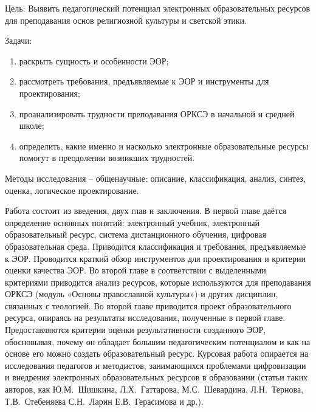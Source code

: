 Цель:\label{goal}  Выявить педагогический потенциал электронных образовательных ресурсов для преподавания основ религиозной культуры и светской этики.

Задачи:
\begin{enumerate}
\item\label{task1} раскрыть сущность и особенности ЭОР;
\item\label{task2} рассмотреть требования, предъявляемые к ЭОР и инструменты для проектирования; 
\item\label{task3} проанализировать трудности преподавания ОРКСЭ в начальной и средней школе;
\item\label{task4}  определить, какие именно и насколько электронные образовательные ресурсы помогут в преодолении возникших трудностей.
\end{enumerate}

Методы исследования – общенаучные: описание, классификация, анализ, синтез, оценка, логическое проектирование.

Работа состоит из введения, двух глав и заключения. В первой главе даётся определение основных понятий: электронный учебник, электронный образовательный ресурс, система дистанционного обучения, цифровая образовательная среда. Приводится классификация и требования, предъявляемые к ЭОР. Проводится краткий обзор инструментов для проектирования и критерии оценки качества ЭОР.
Во второй главе в соответствии с выделенными критериями приводится анализ ресурсов, которые используются для преподавания ОРКСЭ (модуль «Основы православной культуры») и других дисциплин, связанных с теологией. Во второй главе приводится проект образовательного ресурса, опираясь на результаты исследования, полученные в первой главе.
Предоставляются критерии оценки результативности созданного ЭОР, обосновывая, почему он обладает большим педагогическим потенциалом и как на основе его можно создать образовательный ресурс.
Курсовая работа опирается на исследования педагогов и методистов, занимающихся проблемами цифровизации и внедрения электронных образовательных ресурсов в образовании (статьи таких авторов, как Ю.М.~Шишкина, Л.Х.~Гаттарова, М.С.~Шевардина, Л.Н.~Тернова, Т.В.~Стебеняева С.Н.~Ларин Е.В.~Герасимова и др.).
